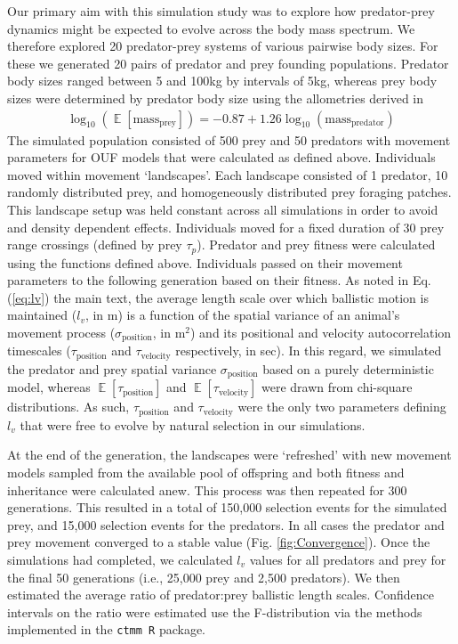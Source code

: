 \documentclass[12pt]{article}
\DeclareMathOperator{\E}{\mathbb{E}}
\begin{document}
Our primary aim with this simulation study was to explore how predator-prey dynamics might be expected to evolve across the body mass spectrum. We therefore explored 20 predator-prey systems of various pairwise body sizes. For these we generated 20 pairs of predator and prey founding populations. Predator body sizes ranged between 5 and 100kg by intervals of 5kg, whereas prey body sizes were determined by predator body size using the allometries derived in \cite{Tucker:2014b} 
\begin{gather}
\log_{10}(\E[\mathrm{mass_{prey}}]) = -0.87 + 1.26 \log_{10}(\mathrm{mass_{predator}})
\end{gather}
The simulated population consisted of 500 prey and 50 predators with movement parameters for OUF models that were calculated as defined above. Individuals moved within movement `landscapes'. Each landscape consisted of 1 predator, 10 randomly distributed prey, and homogeneously distributed prey foraging patches. This landscape setup was held constant across all simulations in order to avoid and density dependent effects. Individuals moved for a fixed duration of 30 prey range crossings (defined by prey $\tau_p$). Predator and prey fitness were calculated using the functions defined above. Individuals passed on their movement parameters to the following generation based on their fitness. As noted in Eq. (\ref{eq:lv}) the main text, the average length scale over which ballistic motion is maintained ($l_v$, in m) is a function of the spatial variance of an animal's movement process ($\sigma_{\mathrm{position}}$, in m$^2$) and its positional and velocity autocorrelation timescales ($\tau_{\mathrm{position}}$ and $\tau_\mathrm{velocity}$ respectively, in sec). In this regard, we simulated the predator and prey spatial variance $\sigma_{\mathrm{position}}$ based on a purely deterministic model, whereas $\E[\tau_\mathrm{position}]$ and $\E[\tau_\mathrm{velocity}]$ were drawn from chi-square distributions. As such, $\tau_\mathrm{position}$ and $\tau_\mathrm{velocity}$ were the only two parameters defining $l_v$ that were free to evolve by natural selection in our simulations.

At the end of the generation, the landscapes were `refreshed' with new movement models sampled from the available pool of offspring and both fitness and inheritance were calculated anew. This process was then repeated for 300 generations. This resulted in a total of 150,000 selection events for the simulated prey, and 15,000 selection events for the predators. In all cases the predator and prey movement converged to a stable value (Fig. \ref{fig:Convergence}). Once the simulations had completed, we calculated $l_v$ values for all predators and prey for the final 50 generations (i.e., 25,000 prey and 2,500 predators). We then estimated the average ratio of predator:prey ballistic length scales. Confidence intervals on the ratio were estimated use the F-distribution via the methods implemented in the \texttt{ctmm R} package.
\end{document}
